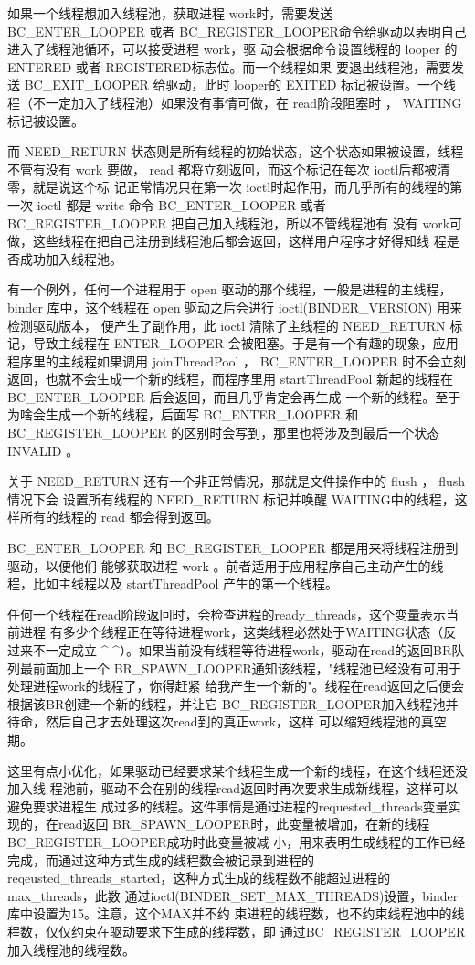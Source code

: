 \documentclass[a4paper,11pt]{article}
\begin{document}
如果一个线程想加入线程池，获取进程 work时，需要发送 BC_ENTER_LOOPER 或者
BC_REGISTER_LOOPER命令给驱动以表明自己进入了线程池循环，可以接受进程 work，驱
动会根据命令设置线程的 looper 的 ENTERED 或者 REGISTERED标志位。而一个线程如果
要退出线程池，需要发送 BC_EXIT_LOOPER 给驱动，此时 looper的 EXITED
标记被设置。一个线程（不一定加入了线程池）如果没有事情可做，在 read阶段阻塞时
， WAITING 标记被设置。


而 NEED_RETURN 状态则是所有线程的初始状态，这个状态如果被设置，线程不管有没有
work 要做， read 都将立刻返回，而这个标记在每次 ioctl后都被清零，就是说这个标
记正常情况只在第一次 ioctl时起作用，而几乎所有的线程的第一次 ioctl 都是 write
命令 BC_ENTER_LOOPER 或者BC_REGISTER_LOOPER 把自己加入线程池，所以不管线程池有
没有 work可做，这些线程在把自己注册到线程池后都会返回，这样用户程序才好得知线
程是否成功加入线程池。

有一个例外，任何一个进程用于 open 驱动的那个线程，一般是进程的主线程， binder
库中，这个线程在 open 驱动之后会进行 ioctl(BINDER_VERSION) 用来检测驱动版本，
便产生了副作用，此 ioctl 清除了主线程的 NEED_RETURN 标记，导致主线程在 ENTER_LOOPER
会被阻塞。于是有一个有趣的现象，应用程序里的主线程如果调用 joinThreadPool ，
BC_ENTER_LOOPER 时不会立刻返回，也就不会生成一个新的线程，而程序里用
startThreadPool 新起的线程在 BC_ENTER_LOOPER 后会返回，而且几乎肯定会再生成
一个新的线程。至于为啥会生成一个新的线程，后面写 BC_ENTER_LOOPER 和
 BC_REGISTER_LOOPER 的区别时会写到，那里也将涉及到最后一个状态 INVALID 。

关于 NEED_RETURN 还有一个非正常情况，那就是文件操作中的 flush ， flush情况下会
设置所有线程的 NEED_RETURN 标记并唤醒 WAITING中的线程，这样所有的线程的 read
都会得到返回。


BC_ENTER_LOOPER 和 BC_REGISTER_LOOPER 都是用来将线程注册到驱动，以便他们
能够获取进程 work 。前者适用于应用程序自己主动产生的线程，比如主线程以及
startThreadPool 产生的第一个线程。

任何一个线程在read阶段返回时，会检查进程的ready_threads，这个变量表示当前进程
有多少个线程正在等待进程work，这类线程必然处于WAITING状态（反过来不一定成立
\^{}-\^{}）。如果当前没有线程等待进程work，驱动在read的返回BR队列最前面加上一个
BR_SPAWN_LOOPER通知该线程，"线程池已经没有可用于处理进程work的线程了，你得赶紧
给我产生一个新的"。线程在read返回之后便会根据该BR创建一个新的线程，并让它
BC_REGISTER_LOOPER加入线程池并待命，然后自己才去处理这次read到的真正work，这样
可以缩短线程池的真空期。

这里有点小优化，如果驱动已经要求某个线程生成一个新的线程，在这个线程还没加入线
程池前，驱动不会在别的线程read返回时再次要求生成新线程，这样可以避免要求进程生
成过多的线程。这件事情是通过进程的requested_threads变量实现的，在read返回
BR_SPAWN_LOOPER时，此变量被增加，在新的线程BC_REGISTER_LOOPER成功时此变量被减
小，用来表明生成线程的工作已经完成，而通过这种方式生成的线程数会被记录到进程的
reqeusted_threads_started，这种方式生成的线程数不能超过进程的max_threads，此数
通过ioctl(BINDER_SET_MAX_THREADS)设置，binder库中设置为15。注意，这个MAX并不约
束进程的线程数，也不约束线程池中的线程数，仅仅约束在驱动要求下生成的线程数，即
通过BC_REGISTER_LOOPER加入线程池的线程数。
\end{document}
